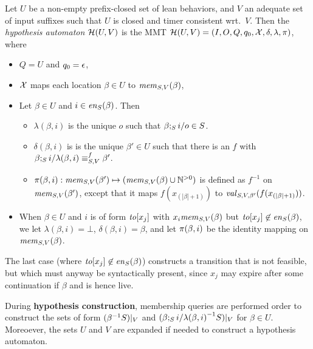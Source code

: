 \begin{definition}
\label{def:hypo}
  Let $U$ be a non-empty prefix-closed set of lean behaviors,
  and $V$ an adequate set of input suffixes such that
  $U$ is closed and timer consistent wrt.\ $V$. Then the
{\em hypothesis automaton} $\hypoof UV$ is the MMT
$\hypoof UV = (I, O, Q, q_0, \vars, \delta, \lambda, \remap)$, where
\begin{itemize}
\item $Q = U$ and $q_0 = \emptyword$,
\item $\vars$ maps each location $\beta\in U$ to $\apprgetmemorable{S}{\beta}{V}$,
\item Let $\beta \in U$ and $i \in \feasibleinputs{\beta}{S}$. Then
  \begin{itemize}
    \item $\lambda(\beta,i)$ is
     the unique $o$ such that $\extend{\beta}{i}{o} \in S$. 
    \item $\delta(\beta,i)$ is is
        the unique $\beta' \in U$ such that there is an $f$ with
  $\extend{\beta}{i}{\lambda(\beta,i)} \equiv_{S,V}^f \beta'$.
      \item $\remap(\beta,i):\apprgetmemorable{S}{\beta'}{V} \mapsto (\apprgetmemorable{S}{\beta}{V} \cup \natplus)$ is defined as $f^{-1}$ on
        $\apprgetmemorable{S}{\beta'}{V}$, except that it maps
        $f(x_{(|\beta|+1)})$ to
      $\apprgetassignment{S}{\beta'}{V}(f(x_{(|\beta|+1)}))$.
  \end{itemize}
\item When $\beta \in U$ and $i$ is of form $\toevent{x_j}$ with
  $x_i \apprgetmemorable{S}{\beta}{V}$ but
  $\toevent{x_j} \not\in\feasibleinputs{\beta}{S}$, we let
  $\lambda(\beta,i) = \bot$, 
  $\delta(\beta,i) = \beta$, and let
  $\remap(\beta,i)$ be the identity mapping on $\apprgetmemorable{S}{\beta}{V}$.
\end{itemize}
\end{definition}
The last case (where  $\toevent{x_j} \not\in\feasibleinputs{\beta}{S}$)
constructs a transition that is not feasible,
but which must anyway be syntactically present, since $x_j$
may expire after some continuation if $\beta$ and is hence live.

 During {\bf hypothesis construction}, membership queries are performed order
 to construct the sets of form $\apprsuffixbehs{S}{\beta}{V}$ and
 $\apprsuffixbehs{S}{\extend{\beta}{i}{\lambda(\beta,i)}}{V}$ for $\beta \in U$.
 Moreoever, the sets $U$ and $V$ are expanded if needed to construct
 a hypothesis automaton.

